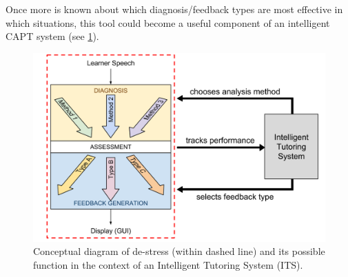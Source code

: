 \documentclass[a0,portrait]{a0poster}
\newcommand{\headingcolor}{\color{BannerSixColor}}
\def\Highlight#1{{\sffamily \headingcolor #1}}
\begin{document}
\begin{textblock}{7}
Once more is known about which diagnosis/feedback types are most effective in which situations, this tool could become a useful component of an intelligent CAPT system (see \cref{fig:hourglass-ITS}).



\vspace{1em}

	\begin{figure}
	\centering
	\includegraphics[width=\textwidth]{../../../colloquium/hourglass-colloq-full}
	\caption{Conceptual diagram of \Highlight{de-stress} (within dashed line) and its possible function in the context of an Intelligent Tutoring System (ITS).}
	\label{fig:hourglass-ITS}
	\end{figure}
 
\end{textblock}


\end{document}
